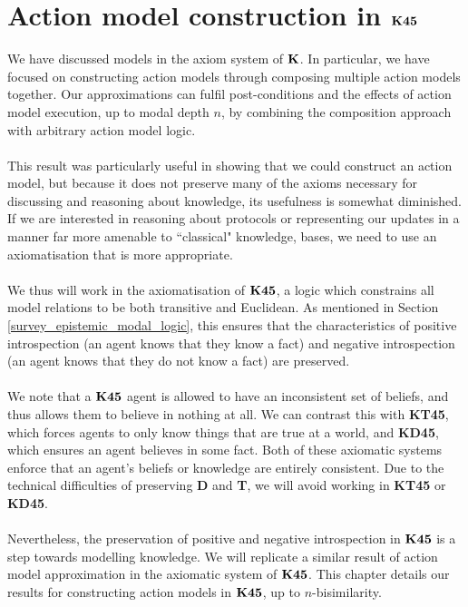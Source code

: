 \chapter{Action model construction in $\bf K45$} \label{chapter:k45}

We have discussed models in the axiom system of $\bf K$.
In particular, we have focused on constructing action models through composing multiple action
models together.
Our approximations can fulfil post-conditions and the effects of action model execution, up to modal
depth $n$, by combining the composition approach with arbitrary action model logic.\\
\\
This result was particularly useful in showing that we could construct an action model, but because
it does not preserve many of the axioms necessary for discussing and reasoning about knowledge, its
usefulness is somewhat diminished.
If we are interested in reasoning about protocols or representing our updates in a manner far more
amenable to ``classical" knowledge, bases, we need to use an axiomatisation that is more
appropriate.\\
\\
We thus will work in the axiomatisation of $\bf K45$, a logic which constrains all model relations to
be both transitive and Euclidean.
As mentioned in Section \ref{survey_epistemic_modal_logic}, this ensures that
the characteristics of positive introspection (an agent knows that they know a fact) and
negative introspection (an agent knows that they do not know a fact) are
preserved.\\
\\
We note that a $\bf K45$ agent is allowed to have an inconsistent set of beliefs, and thus
allows them to believe in nothing at all.
We can contrast this with {\bf KT45}, which forces agents to only know things
that are true at a world, and {\bf KD45}, which ensures an agent believes in
some fact.
Both of these axiomatic systems enforce that an agent's beliefs or knowledge are
entirely consistent.
Due to the technical difficulties of preserving {\bf D} and {\bf T}, we will
avoid working in {\bf KT45} or {\bf KD45}.\\
\\
Nevertheless, the preservation of positive and negative introspection in
$\bf K45$ is a step towards modelling knowledge.
We will replicate a similar result of action model approximation in the axiomatic system
of $\bf K45$.
This chapter details our results for constructing action models in $\bf K45$, up to $n$-bisimilarity.\\
